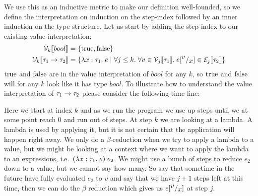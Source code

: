 We use this as an inductive metric to make our definition well-founded, so we define the interpretation on induction on the step-index followed by an inner induction on the type structure. Let us start by adding the step-index to our existing value interpretation:
\begin{align*}
  \vpres{bool} &= \{\true,\false\} \\
  \vpres{\tarrow{\tau_1}{\tau_2}} &= \{\tlabs{x}{\tau_1}{e} \vbar \forall j \leq k. \; \forall v \in \vpres[j]{\tau_1}. \; \sub{e}{v}{x} \in \epres[j]{\tau_2} \}
\end{align*}
$\true$ and $\false$ are in the value interpretation of $bool$ for any $k$, so $\true$ and $\false$ will for any $k$ look like it has type $bool$. To illustrate how to understand the value interpretation of $\tarrow{\tau_1}{\tau_2}$ please consider the following time line:  \\
\begin{center}
\end{center}
Here we start at index $k$ and as we run the program we use up steps until we at some point reach 0 and run out of steps. At step $k$ we are looking at a lambda. A lambda is used by applying it, but it is not certain that the application will happen right away. We only do a $\beta$-reduction when we try to apply a lambda to a value, but we might be looking at a context where we want to apply the lambda to an expressions, i.e.\ $(\tlabs{x}{\tau_1}{e})\; e_2$. We might use a bunch of steps to reduce $e_2$ down to a value, but we cannot say how many. So say that sometime in the future have fully evaluated $e_2$ to $v$ and say that we have $j+1$ steps left at this time, then we can do the $\beta$ reduction which gives us $\sub{e}{v}{x}$ at step $j$. %

